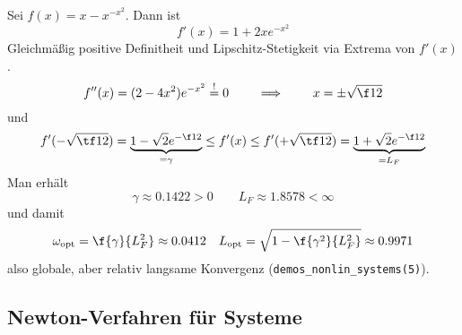 \documentclass[11pt]{scrartcl}
\begin{document}
\begin{st}
\begin{note}
\begin{itemize}
		\end{itemize}
	\end{note}
\end{st}

\begin{ex*}
	Sei $f(x) = x - x^{-x^2}$.
	Dann ist
	\[
		f'(x) = 1 + 2xe^{-x^2}
	\]
	Gleichmäßig positive Definitheit und Lipschitz-Stetigkeit via Extrema von $f'(x)$.	
	\[
		f''(x) = (2-4x^2)e^{-x^2} \stackrel != 0
		\qquad \implies \qquad
		x = \pm \sqrt{\f 12}
	\]
	und
	\begin{align*}
		f'(-\sqrt{\tf 12}) = \underbrace{1 - \sqrt 2 e^{-\f 12}}_{= \gamma} \le f'(x) \le f'(+\sqrt{\tf 12}) = \underbrace{1 + \sqrt 2 e^{- \f 12}}_{= L_F}
	\end{align*}
	Man erhält
	\[
		\gamma \approx 0.1422 > 0
		\qquad
		L_F \approx 1.8578 < \infty
	\]
	und damit
	\begin{align*}
		\omega_{\text{opt}} &= \f{\gamma}{L_F^2} \approx 0.0412 &
		L_{\text{opt}} = \sqrt{1- \f{\gamma^2}{L_F^2}} \approx 0.9971
	\end{align*}
	also globale, aber relativ langsame Konvergenz (\verb|demos_nonlin_systems(5)|).
\end{ex*}


\subsection{Newton-Verfahren für Systeme}
\end{document}
